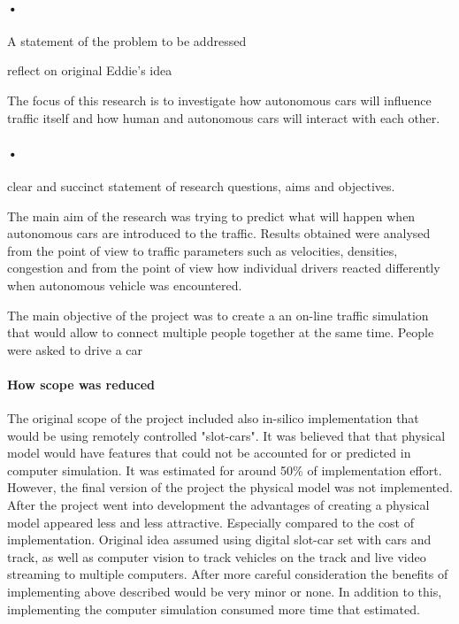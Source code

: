 \documentclass[11pt]{article}
\begin{document}
\paragraph{•}
A statement of the problem to be addressed

reflect on original Eddie's idea


The focus of this research is to investigate how autonomous cars will influence traffic itself and how human and autonomous cars will interact with each other.




\paragraph{•}
clear and succinct statement of research questions, aims and objectives.


The main aim of the research was trying to predict what will happen when autonomous cars are introduced to the traffic. Results obtained were analysed from the point of view to traffic parameters such as velocities, densities, congestion and from the point of view how individual drivers reacted differently when autonomous vehicle was encountered.

The main objective of the project was to create a an on-line traffic simulation that would allow to connect multiple people together at the same time. People were asked to drive a car 

\paragraph{How scope was reduced}

The original scope of the project included also in-silico implementation that would be using remotely controlled "slot-cars". It was believed that that physical model would have features that could not be accounted for or predicted in computer simulation. It was estimated for around 50\% of implementation effort. However, the final version of the project the physical model was not implemented. After the project went into development the advantages of creating a physical model appeared less and less attractive. Especially compared to the cost of implementation. Original idea assumed using digital slot-car set with cars and track, as well as computer vision to track vehicles on the track and live video streaming to multiple computers. After more careful consideration the benefits of implementing above described would be very minor or none. In addition to this, implementing the computer simulation consumed more time that estimated. 
\end{document}
